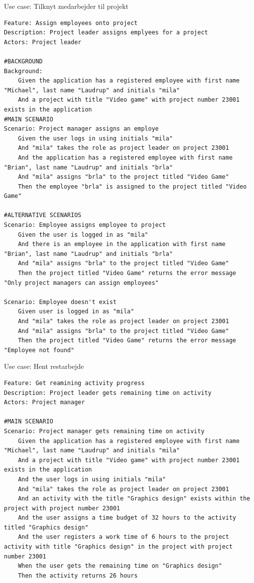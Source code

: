 \begin{listing}[H]
    \centering
    \caption{Use case: Tilknyt medarbejder til projekt}\label{lst:assign_employ}
    \begin{verbatim}
Feature: Assign employees onto project
Description: Project leader assigns emplyees for a project
Actors: Project leader

#BACKGROUND
Background:
    Given the application has a registered employee with first name "Michael", last name "Laudrup" and initials "mila"
    And a project with title "Video game" with project number 23001 exists in the application
#MAIN SCENARIO
Scenario: Project manager assigns an employe
    Given the user logs in using initials "mila"
    And "mila" takes the role as project leader on project 23001
    And the application has a registered employee with first name "Brian", last name "Laudrup" and initials "brla"
    And "mila" assigns "brla" to the project titled "Video Game"
    Then the employee "brla" is assigned to the project titled "Video Game"

#ALTERNATIVE SCENARIOS
Scenario: Employee assigns employee to project
    Given the user is logged in as "mila"
    And there is an employee in the application with first name "Brian", last name "Laudrup" and initials "brla"
    And "mila" assigns "brla" to the project titled "Video Game"
    Then the project titled "Video Game" returns the error message "Only project managers can assign employees"

Scenario: Employee doesn't exist
    Given user is logged in as "mila"
    And "mila" takes the role as project leader on project 23001
    And "mila" assigns "brla" to the project titled "Video Game"
    Then the project titled "Video Game" returns the error message "Employee not found"
    \end{verbatim}
\end{listing}
\begin{listing}[H]
    \centering
    \caption{Use case: Hent restarbejde}\label{lst:remainingTime}
    \begin{verbatim}
Feature: Get reamining activity progress
Description: Project leader gets remaining time on activity
Actors: Project manager

#MAIN SCENARIO
Scenario: Project manager gets remaining time on activity
    Given the application has a registered employee with first name "Michael", last name "Laudrup" and initials "mila"
    And a project with title "Video game" with project number 23001 exists in the application
    And the user logs in using initials "mila"
    And "mila" takes the role as project leader on project 23001
    And an activity with the title "Graphics design" exists within the project with project number 23001
    And the user assigns a time budget of 32 hours to the activity titled "Graphics design"
    And the user registers a work time of 6 hours to the project activity with title "Graphics design" in the project with project number 23001
    When the user gets the remaining time on "Graphics design"
    Then the activity returns 26 hours
    \end{verbatim}
\end{listing}\newpage
